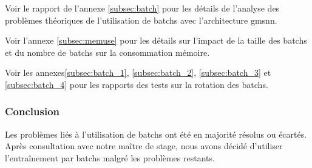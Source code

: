 Voir le rapport de l'annexe \ref{subsec:batch} pour les détails de l'analyse des problèmes théoriques de l'utilisation de \glspl{batch} avec l'architecture \gls{gmsnn}.

Voir l'annexe \ref{subsec:memuse} pour les détails sur l'impact de la taille des \glspl{batch} et du nombre de \glspl{batch} sur la consommation mémoire.

Voir les annexes\ref{subsec:batch_1}, \ref{subsec:batch_2}, \ref{subsec:batch_3} et \ref{subsec:batch_4} pour les rapports des tests sur la rotation des \glspl{batch}.

\subsubsection{Conclusion}
Les problèmes liés à l'utilisation de \glspl{batch} ont été en majorité résolus ou écartés. Après consultation avec notre maître de stage, nous avons décidé d'utiliser l'entraînement par \glspl{batch} malgré les problèmes restants.